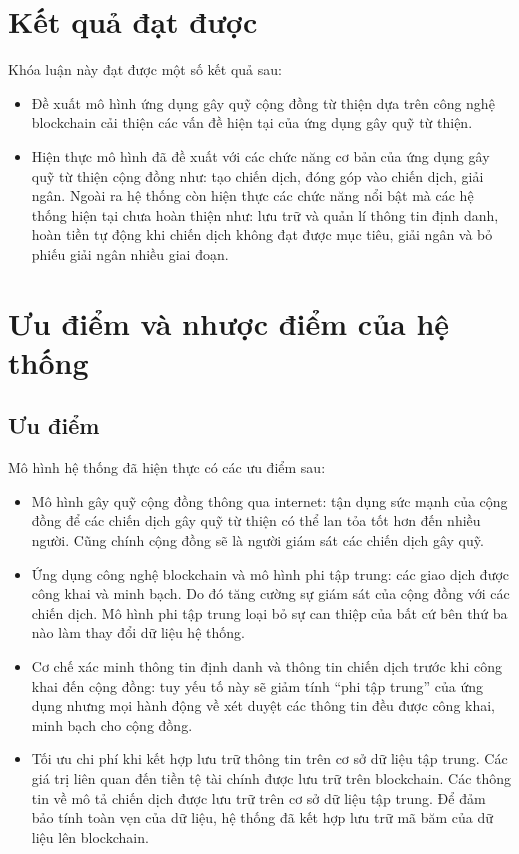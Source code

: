 \documentclass[../main-report.tex]{subfiles}
\begin{document}
\section{Kết quả đạt được}
Khóa luận này đạt được một số kết quả sau:

\begin{itemize}
\item Đề xuất mô hình ứng dụng gây quỹ cộng đồng từ thiện dựa trên công nghệ \gls{blockchain} cải thiện các vấn đề hiện tại của ứng dụng gây quỹ từ thiện.
\item Hiện thực mô hình đã đề xuất với các chức năng cơ bản của ứng dụng gây quỹ từ thiện cộng đồng như: tạo chiến dịch, đóng góp vào chiến dịch, giải ngân. Ngoài ra hệ thống còn hiện thực các chức năng nổi bật mà các hệ thống hiện tại chưa hoàn thiện như: lưu trữ và quản lí thông tin định danh, hoàn tiền tự động khi chiến dịch không đạt được mục tiêu, giải ngân và bỏ phiếu giải ngân nhiều giai đoạn.
\end{itemize}

\section{Ưu điểm và nhược điểm của hệ thống}
\subsection{Ưu điểm}
Mô hình hệ thống đã hiện thực có các ưu điểm sau:

\begin{itemize}
\item Mô hình gây quỹ cộng đồng thông qua internet: tận dụng sức mạnh của cộng đồng để các chiến dịch gây quỹ từ thiện có thể lan tỏa tốt hơn đến nhiều người. Cũng chính cộng đồng sẽ là người giám sát các chiến dịch gây quỹ.
\item Ứng dụng công nghệ blockchain và mô hình phi tập trung: các giao dịch được công khai và minh bạch. Do đó tăng cường sự giám sát của cộng đồng với các chiến dịch. Mô hình phi tập trung loại bỏ sự can thiệp của bất cứ bên thứ ba nào làm thay đổi dữ liệu hệ thống.
\item Cơ chế xác minh thông tin định danh và thông tin chiến dịch trước khi công khai đến cộng đồng: tuy yếu tố này sẽ giảm tính ``phi tập trung'' của ứng dụng nhưng mọi hành động về xét duyệt các thông tin đều được công khai, minh bạch cho cộng đồng.
\item Tối ưu chi phí khi kết hợp lưu trữ thông tin trên cơ sở dữ liệu tập trung. Các giá trị liên quan đến tiền tệ tài chính được lưu trữ trên blockchain. Các thông tin về mô tả chiến dịch được lưu trữ trên cơ sở dữ liệu tập trung. Để đảm bảo tính toàn vẹn của dữ liệu, hệ thống đã kết hợp lưu trữ mã băm của dữ liệu lên blockchain.
\end{itemize}
\end{document}
